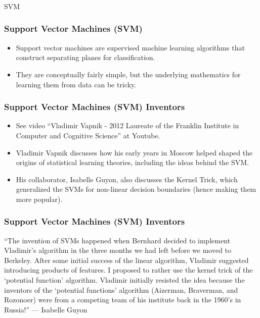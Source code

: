 \begin{frame}[fragile]\frametitle{}
\begin{center}
{\Large SVM}
\end{center}
\end{frame}

\begin{frame}[fragile]\frametitle{Support Vector Machines (SVM)}
\begin{itemize}
\item Support vector machines are supervised machine learning algorithms that construct
separating planes for classification.
\item They are conceptually fairly simple, but the underlying mathematics for learning them from data can be tricky.
\end{itemize}
\end{frame}


\begin{frame}[fragile]\frametitle{Support Vector Machines (SVM) Inventors}
\begin{itemize}
\item See video ``Vladimir Vapnik - 2012 Laureate of the Franklin Institute in Computer and Cognitive Science'' at Youtube.
\item Vladimir Vapnik discusses how his early years in Moscow helped shaped the origins of statistical learning theories, including the ideas behind the SVM. 
\item His collaborator, Isabelle Guyon, also discusses the Kernel Trick, which generalized the SVMs for non-linear decision boundaries (hence making them more popular).
\end{itemize}


\end{frame}

\begin{frame}[fragile]\frametitle{Support Vector Machines (SVM) Inventors}
``The invention of SVMs happened when Bernhard decided to implement Vladimir’s algorithm in the three months we had left before we moved to Berkeley. After some initial success of the linear algorithm, Vladimir suggested introducing products of features. I proposed to rather use the kernel trick of the ‘potential function’ algorithm. Vladimir initially resisted the idea because the inventors of the ‘potential functions’ algorithm (Aizerman, Braverman, and Rozonoer) were from a competing team of his institute back in the 1960’s in Russia!''
— Isabelle Guyon

\end{frame}

